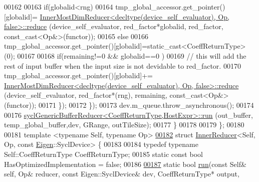\begin{DoxyCode}
00162 
00163         \textcolor{keywordflow}{if}(globalid<rng)
00164           tmp\_global\_accessor.get\_pointer()[globalid]=
      \hyperlink{struct_eigen_1_1internal_1_1_inner_most_dim_reducer}{InnerMostDimReducer<decltype(device\_self\_evaluator), Op, false>::reduce}
      (device\_self\_evaluator, red\_factor*globalid, red\_factor, \textcolor{keyword}{const\_cast<}Op&\textcolor{keyword}{>}(functor));
00165         \textcolor{keywordflow}{else}
00166           tmp\_global\_accessor.get\_pointer()[globalid]=\textcolor{keyword}{static\_cast<}CoeffReturnType\textcolor{keyword}{>}(0);
00167 
00168         \textcolor{keywordflow}{if}(remaining!=0 && globalid==0 )
00169           \textcolor{comment}{// this will add the rest of input buffer when the input size is not devidable to red\_factor.}
00170           tmp\_global\_accessor.get\_pointer()[globalid]+=
      \hyperlink{struct_eigen_1_1internal_1_1_inner_most_dim_reducer}{InnerMostDimReducer<decltype(device\_self\_evaluator), Op, false>::reduce}
      (device\_self\_evaluator, red\_factor*(rng), remaining, const\_cast<Op&>(functor));
00171       \});
00172     \});
00173   dev.m\_queue.throw\_asynchronous();
00174 
00176   \hyperlink{struct_eigen_1_1internal_1_1sycl_generic_buffer_reducer}{syclGenericBufferReducer<CoeffReturnType,HostExpr>::run}
      (out\_buffer, temp\_global\_buffer,dev, GRange,  outTileSize);
00177   \}
00178 
00179 \};
00180 
00181 \textcolor{keyword}{template} <\textcolor{keyword}{typename} Self, \textcolor{keyword}{typename} Op>
\hyperlink{struct_eigen_1_1internal_1_1_inner_reducer_3_01_self_00_01_op_00_01const_01_eigen_1_1_sycl_device_01_4}{00182} \textcolor{keyword}{struct }\hyperlink{struct_eigen_1_1internal_1_1_inner_reducer}{InnerReducer}<Self, Op, const \hyperlink{namespace_eigen}{Eigen}::SyclDevice> \{
00183 
00184   \textcolor{keyword}{typedef} \textcolor{keyword}{typename} Self::CoeffReturnType CoeffReturnType;
00185   \textcolor{keyword}{static} \textcolor{keyword}{const} \textcolor{keywordtype}{bool} HasOptimizedImplementation = \textcolor{keyword}{false};
00186 
\hyperlink{struct_eigen_1_1internal_1_1_inner_reducer_3_01_self_00_01_op_00_01const_01_eigen_1_1_sycl_device_01_4_a471bb175078f166e0d5c4040fc4494d9}{00187}   \textcolor{keyword}{static} \textcolor{keywordtype}{bool} \hyperlink{struct_eigen_1_1internal_1_1_inner_reducer_3_01_self_00_01_op_00_01const_01_eigen_1_1_sycl_device_01_4_a471bb175078f166e0d5c4040fc4494d9}{run}(\textcolor{keyword}{const} Self& \textcolor{keyword}{self}, Op& reducer, \textcolor{keyword}{const} Eigen::SyclDevice& dev, CoeffReturnType* output, \textcolor{keyword}{
}
\end{DoxyCode}
